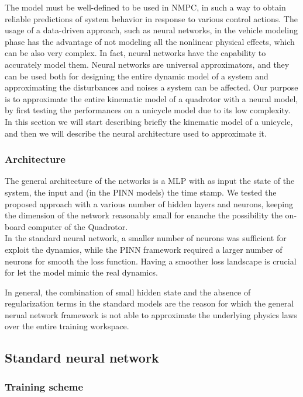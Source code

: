 The model must be well-defined to be used in NMPC, in such a way 
to obtain reliable predictions of system behavior in response to various control actions.
The usage of a data-driven approach, such as neural networks, in the vehicle modeling phase has the
advantage of not modeling all the nonlinear physical effects, which can be also very complex.
In fact, neural networks have the capability to accurately model them. 
Neural networks are universal approximators, and they can be used both for designing 
the entire dynamic model of a system and approximating the disturbances and noises 
a system can be affected.
Our purpose is to approximate the entire kinematic model of a quadrotor with a neural model, by first testing the performances on a unicycle model due to its low complexity. 
In this section we will start describing briefly the kinematic model of a unicycle, and then 
we will describe the neural architecture used to approximate it.

\subsubsection{Architecture}
The general architecture of the networks is a MLP with as input the state of the system, the input and (in the PINN models) the time stamp.
We tested the proposed approach with a various number of hidden layers and neurons, keeping the dimension of the network reasonably small 
for enanche the possibility the on-board computer of the Quadrotor.
\\

In the standard neural network, a smaller number of neurons was sufficient for exploit the dynamics, while the PINN framework required a larger number of neurons for smooth 
the loss function. Having a smoother loss landscape is crucial for let the model mimic the real dynamics.

In general, the combination of small hidden state and the absence of regularization terms in the standard models are 
the reason for which the general nerual network framework is not able to approximate the underlying physics laws over the entire training workspace.


\subsection{Standard neural network}

\subsubsection{Training scheme}

